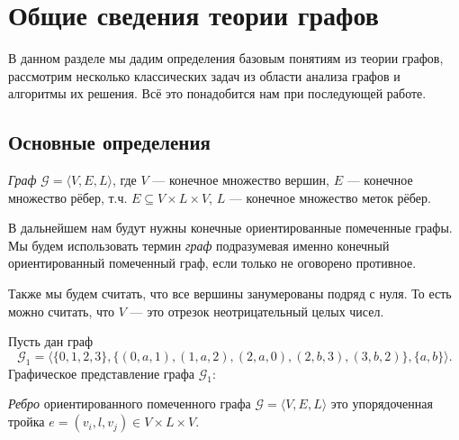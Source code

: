 \chapter{Общие сведения теории графов}

В данном разделе мы дадим определения базовым понятиям из теории графов, рассмотрим несколько классических задач из области анализа графов и алгоритмы их решения.
Всё это понадобится нам при последующей работе.

\section{Основные определения}

\begin{definition}
  \textit{Граф} $\mathcal{G} = \langle V, E, L \rangle$, где $V$ --- конечное множество вершин, $E$ --- конечное множество рёбер, т.ч. $E \subseteq V \times L \times V$, $L$ --- конечное множество меток рёбер.
\end{definition}

В дальнейшем нам будут нужны конечные ориентированные помеченные графы.
Мы будем использовать термин \textit{граф} подразумевая именно конечный ориентированный помеченный граф, если только не оговорено противное.

Также мы будем считать, что все вершины занумерованы подряд с нуля.
То есть можно считать, что $V$ --- это отрезок неотрицательный целых чисел.

\begin{example}
  Пусть дан граф $$\mathcal{G}_1 = \langle \{0,1,2,3\}, \{(0,a,1), (1,a,2), (2,a,0), (2,b,3), (3,b,2)\}, \{a,b\} \rangle.$$
  Графическое представление графа $\mathcal{G}_1$:
  \begin{center}
  \end{center}
\end{example}

\begin{definition}
  \textit{Ребро} ориентированного помеченного графа $\mathcal{G} = \langle V, E, L \rangle$ это упорядоченная тройка $e = (v_i,l,v_j) \in V \times L \times V$.
\end{definition}

